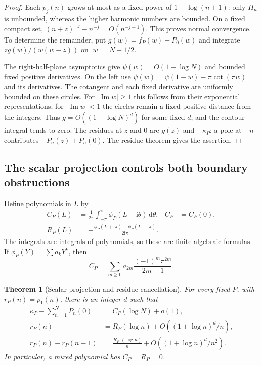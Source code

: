 \documentclass[11pt,a4paper]{article}
\numberwithin{equation}{section}
\newtheorem{theorem}{Theorem}[section]
\theoremstyle{definition}
\theoremstyle{remark}
\DeclareMathOperator{\im}{Im}
\newcommand{\dd}{\,\mathrm d}
\newcommand{\ii}{\mathrm i}
\begin{document}
\begin{proof}
Each $p_j(n)$ grows at most as a fixed power of $1+\log(n+1)$:
only $H_n$ is unbounded, whereas the higher harmonic numbers are bounded.
On a fixed compact set,
$(n+z)^{-j}-n^{-j}=O(n^{-j-1})$. This proves normal convergence.
To determine the remainder, put $g(w)=f_P(w)-P_0(w)$ and integrate
$zg(w)/(w(w-z))$ on $|w|=N+1/2$.

The right-half-plane asymptotics give $\psi(w)=O(1+\log N)$ and
bounded fixed positive derivatives. On the left use
$\psi(w)=\psi(1-w)-\pi\cot(\pi w)$ and its derivatives.
The cotangent and each fixed derivative are uniformly bounded on these
circles. For $|\im w|\ge1$ this follows from their exponential
representations; for $|\im w|<1$ the circles remain a fixed positive
distance from the integers. Thus $g=O((1+\log N)^d)$ for some fixed
$d$, and the contour integral tends to zero. The residues at $z$ and
$0$ are $g(z)$ and $-\kappa_P$; a pole at $-n$ contributes
$-P_n(z)+P_n(0)$. The residue theorem gives the assertion.
\end{proof}

\subsection{The scalar projection controls both boundary obstructions}

Define polynomials in $L$ by
\begin{align}
 C_P(L)&=\frac1{2\pi}\int_{-\pi}^{\pi}\phi_P(L+\ii\theta)\dd\theta,
 & C_P&=C_P(0),\label{poly:C}\\
 R_P(L)&=-\frac{\phi_P(L+\ii\pi)-\phi_P(L-\ii\pi)}{2\ii\pi}.
 \label{poly:R}
\end{align}
The integrals are integrals of polynomials, so these are finite algebraic
formulas. If $\phi_P(Y)=\sum a_kY^k$, then
\begin{equation}\label{poly:Cexplicit}
 C_P=\sum_{m\ge0}a_{2m}\frac{(-1)^m\pi^{2m}}{2m+1}.
\end{equation}

\begin{theorem}[Scalar projection and residue cancellation]
\label{poly:filter}
For every fixed $P$, with $r_P(n)=p_1(n)$, there is an integer $d$ such that
\begin{align}
 \kappa_P-\sum_{n=1}^NP_n(0)&=C_P(\log N)+o(1),\label{poly:circle}\\
 r_P(n)&=R_P(\log n)+O((1+\log n)^d/n),\label{poly:rasym}\\
 r_P(n)-r_P(n-1)&=\frac{R_P'(\log n)}n
                      +O((1+\log n)^d/n^2).\label{poly:deltarasym}
\end{align}
In particular, a mixed polynomial has $C_P=R_P=0$.
\end{theorem}
\end{document}
